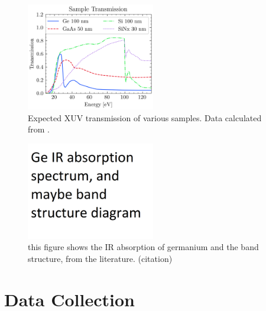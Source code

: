\begin{figure}
	\centering
	\includegraphics[width=0.5\textwidth]{figures/chap3/Sample_trans_CXRO.png}
	\caption{Expected XUV transmission of various samples. Data calculated from \cite{gulliksonCXROXRayInteractions}.}
	\label{fig:Sample_trans_CXRO}
\end{figure}

\begin{figure}
	\centering
	\includegraphics[width=0.5\textwidth]{figures/chap3/Ge_IR_absorption.png}
	\caption{this figure shows the IR absorption of germanium and the band structure, from the literature. (citation)}
	\label{fig:Ge_IR_absorption}
\end{figure}


\section{Data Collection}

